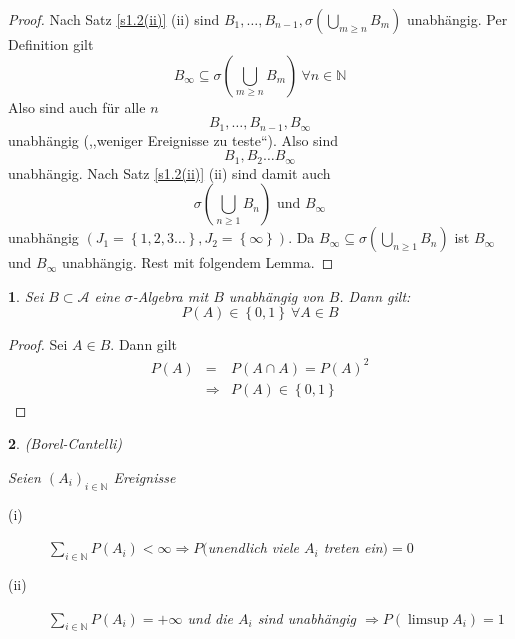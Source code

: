\documentclass[10pt,a4paper]{report}
\numberwithin{equation}{section}
\numberwithin{figure}{section}
\theoremstyle{plain}
\theoremstyle{definition}
\theoremstyle{plain}
\theoremstyle{definition}
\theoremstyle{remark}
\theoremstyle{plain}
\newtheorem{lem}{\protect\lemmaname}[section]
\theoremstyle{plain}
\theoremstyle{plain}
\theoremstyle{plain}
\theoremstyle{plain}
\providecommand{\lemmaname}{Lemma}
\newcommand{\1}{ \mathbb{1} } %
\begin{document}
\begin{proof}
Nach Satz \ref{s1.2(ii)} (ii) sind $B_{1},\ldots,B_{n-1},\sigma\left(\bigcup_{m\geq n}B_{m}\right)$
unabhängig. Per Definition gilt
\[
B_{\infty}\subseteq\sigma\left(\bigcup_{m\geq n}B_{m}\right)\ \forall n\in\mathbb{N}
\]
Also sind auch für alle $n$
\[
B_{1},\ldots,B_{n-1},B_{\infty}
\]
unabhängig (,,weniger Ereignisse zu teste``). Also sind
\[
B_{1},B_{2}\ldots B_{\infty}
\]
unabhängig. Nach Satz \ref{s1.2(ii)} (ii) sind damit auch
\[
\sigma\left(\bigcup_{n\geq1}B_{n}\right)\text{ und }B_{\infty}
\]
unabhängig $\left(J_{1}=\left\{ 1,2,3\ldots\right\} ,J_{2}=\left\{ \infty\right\} \right)$.
Da $B_{\infty}\subseteq\sigma\left(\bigcup_{n\geq1}B_{n}\right)$
ist $B_{\infty}$ und $B_{\infty}$ unabhängig. Rest mit folgendem
Lemma.
\end{proof}
\begin{lem}
Sei $B\subset\mathcal{A}$ eine $\sigma$-Algebra mit $B$ unabhängig
von $B$. Dann gilt:
\[
P\left(A\right)\in\left\{ 0,1\right\} \ \forall A\in B
\]
\end{lem}
\begin{proof}
Sei $A\in B$. Dann gilt
\begin{eqnarray*}
P\left(A\right) & = & P\left(A\cap A\right)=P\left(A\right)^{2}\\
 & \Rightarrow & P\left(A\right)\in\left\{ 0,1\right\} 
\end{eqnarray*}
 \end{proof}
\begin{lem}
(Borel-Cantelli) 

Seien $\left(A_{i}\right)_{i\in\mathbb{N}}$ Ereignisse
\begin{description}
\item [{(i)}] $\sum_{i\in\mathbb{N}}P\left(A_{i}\right)<\infty\Rightarrow$$P($unendlich
viele $A_{i}$ treten ein$)=0$
\item [{(ii)}] $\sum_{i\in\mathbb{N}}P\left(A_{i}\right)=+\infty$ und
die $A_{i}$ sind unabhängig $\Rightarrow P\left(\limsup A_{i}\right)=1$
\end{description}
\end{lem}
\end{document}
